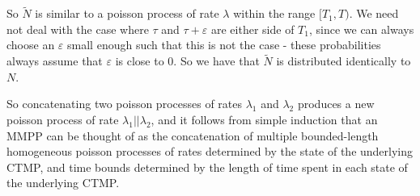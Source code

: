 So $\widetilde{N}$ is similar to a poisson process of rate $\lambda$ within the range $[T_1,T)$. We need not deal with the case where $\tau$ and $\tau+\varepsilon$ are either side of $T_1$, since we can always choose an $\varepsilon$ small enough such that this is not the case - these probabilities always assume that $\varepsilon$ is close to 0. So we have that $\widetilde{N}$ is distributed identically to $N$.

So concatenating two poisson processes of rates $\lambda_1$ and $\lambda_2$ produces a new poisson process of rate $\lambda_1||\lambda_2$, and it follows from simple induction that an MMPP can be thought of as the concatenation of multiple bounded-length homogeneous poisson processes of rates determined by the state of the underlying CTMP, and time bounds determined by the length of time spent in each state of the underlying CTMP.
